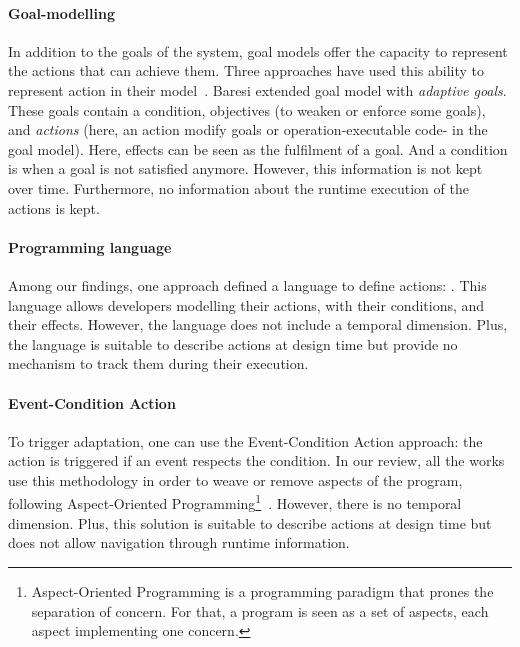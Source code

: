 \paragraph{Goal-modelling}
In addition to the goals of the system, goal models offer the capacity to represent the \glspl{action} that can achieve them.
Three approaches have used this ability to represent action in their model~\cite{DBLP:conf/icse/MendoncaAR14, DBLP:conf/iceccs/BencomoWSW12, DBLP:conf/re/BaresiPS10}.
Baresi \etal extended goal model with \textit{adaptive goals}.
These goals contain a condition, objectives (to weaken or enforce some goals), and \textit{actions} (here, an action modify goals or operation-executable code- in the goal model).
Here, effects can be seen as the fulfilment of a goal.
And a condition is when a goal is not satisfied anymore.
However, this information is not kept over time.
Furthermore, no information about the runtime execution of the actions is kept.
	
\paragraph{Programming language}
Among our findings, one approach defined a language to define actions: \cite{DBLP:journals/jss/ChengG12}.
This language allows developers modelling their actions, with their conditions, and their effects.
However, the language does not include a temporal dimension.
Plus, the language is suitable to describe actions at design time but provide no mechanism to track them during their execution.
	
\paragraph{Event-Condition Action}
To trigger adaptation, one can use the Event-Condition Action approach: the action is triggered if an event respects the condition.
In our review, all the works use this methodology in order to weave or remove aspects of the program, following Aspect-Oriented Programming\footnote{Aspect-Oriented Programming is a programming paradigm that prones the separation of concern. For that, a program is seen as a set of aspects, each aspect implementing one concern.}~\cite{DBLP:conf/icws/CharfiDM09, DBLP:journals/scp/ParraBCD11, DBLP:conf/soco/DavidL06}.
However, there is no temporal dimension.
Plus, this solution is suitable to describe actions at design time but does not allow navigation through runtime information.

